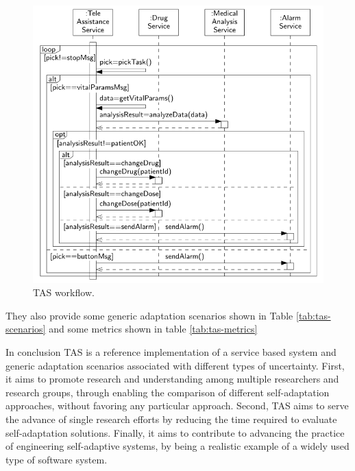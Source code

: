 \begin{figure}[ht]
	\centerline
	{\includegraphics[scale=0.55]{img/tas-workflow.png}}
	\caption[TAS Workflow]{TAS workflow\cite{teleassist}.}
	\label{fig:tas-workflow}
\end{figure}

They also provide some generic adaptation scenarios shown in Table \ref{tab:tas-scenarios} and some metrics shown in table \ref{tab:tas-metrics}

In conclusion TAS is a reference implementation of a service based system and generic adaptation scenarios associated with different types of uncertainty. First, it aims to promote research and understanding among multiple researchers and research groups, through enabling the comparison of different self-adaptation approaches, without favoring any particular approach. Second, TAS aims to serve the advance of single research efforts by reducing the time required to evaluate self-adaptation solutions. Finally, it aims to contribute to advancing the practice of engineering self-adaptive systems, by being a realistic example of a widely used type of software system.

